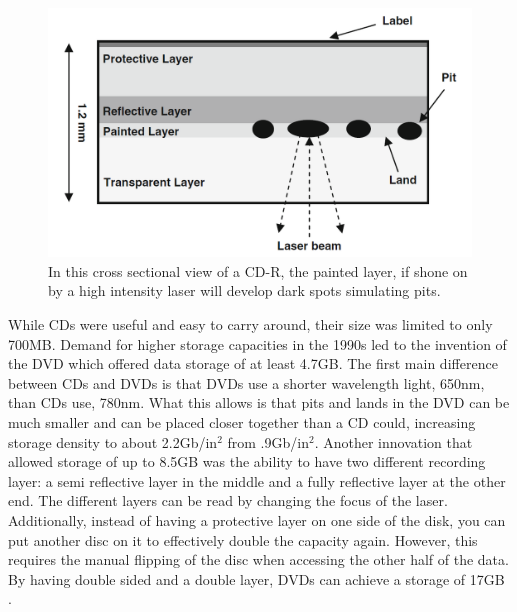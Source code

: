 \documentclass[ notitlepage, numerical, 11pt]{revtex4-1} %
\begin{document}
\begin{figure}[H]
\centerline{\includegraphics[scale=.45]{cdR.png}}
\caption{In this cross sectional view of a CD-R, the painted layer, if shone on by a high intensity laser will develop dark spots simulating pits.}
\label{cdR}
\end{figure} 

While CDs were useful and easy to carry around, their size was limited to only 700MB. Demand for higher storage capacities in the 1990s led to the invention of the DVD which offered data storage of at least 4.7GB. The first main difference between CDs and DVDs is that DVDs use a shorter wavelength light, 650nm, than CDs use, 780nm. What this allows is that pits and lands in the DVD can be much smaller and can be placed closer together than a CD could, increasing storage density to about 2.2Gb/in$^2$ from .9Gb/in$^2$. Another innovation that allowed storage of up to 8.5GB was the ability to have two different recording layer: a semi reflective layer in the middle and a fully reflective layer at the other end. The different layers can be read by changing the focus of the laser. Additionally, instead of having a protective layer on one side of the disk, you can put another disc on it to effectively double the capacity again. However, this requires the manual flipping of the disc when accessing the other half of the data. By having double sided and a double layer, DVDs can achieve a storage of 17GB \cite{memory}.
\end{document}

